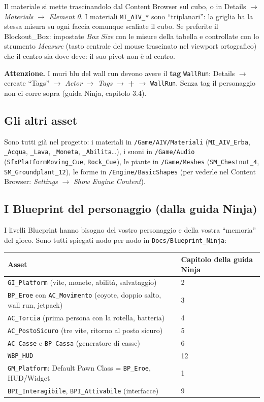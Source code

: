 \documentclass[a4paper,10pt]{article}
\newcommand{\nodo}[1]{\textsf{\textbf{#1}}}
\newcommand{\var}[1]{\texttt{#1}}
\newcommand{\attenzione}[1]{\par\smallskip\noindent\colorbox{orange!12}{\parbox{\dimexpr\linewidth-2\fboxsep}{\small\textbf{Attenzione.} #1}}\par\smallskip}
\begin{document}
Il materiale si mette trascinandolo dal Content Browser sul cubo, o in Details $\rightarrow$ \emph{Materials} $\rightarrow$ \emph{Element 0}. I materiali \var{MI\_AIV\_*} sono ``triplanari'': la griglia ha la stessa misura su ogni faccia comunque scaliate il cubo. Se preferite il Blockout\_Box: impostate \emph{Box Size} con le misure della tabella e controllate con lo strumento \emph{Measure} (tasto centrale del mouse trascinato nel viewport ortografico) che il centro sia dove deve: il suo pivot non è al centro.

\attenzione{I muri blu del wall run devono avere il \textbf{tag} \var{WallRun}: Details $\rightarrow$ cercate ``Tags'' $\rightarrow$ \emph{Actor} $\rightarrow$ \emph{Tags} $\rightarrow$ \nodo{+} $\rightarrow$ \var{WallRun}. Senza tag il personaggio non ci corre sopra (guida Ninja, capitolo 3.4).}

\subsection{Gli altri asset}

Sono tutti già nel progetto: i materiali in \texttt{/Game/AIV/Materiali} (\var{MI\_AIV\_Erba}, \var{\_Acqua}, \var{\_Lava}, \var{\_Moneta}, \var{\_Abilita}\dots), i suoni in \texttt{/Game/Audio} (\var{SfxPlatformMoving\_Cue}, \var{Rock\_Cue}), le piante in \texttt{/Game/Meshes} (\var{SM\_Chestnut\_4}, \var{SM\_Groundplant\_12}), le forme in \texttt{/Engine/BasicShapes} (per vederle nel Content Browser: \emph{Settings} $\rightarrow$ \emph{Show Engine Content}).

\subsection{I Blueprint del personaggio (dalla guida Ninja)}

I livelli Blueprint hanno bisogno del vostro personaggio e della vostra ``memoria'' del gioco. Sono tutti spiegati nodo per nodo in \texttt{Docs/Blueprint\_Ninja}:

\begin{center}
\begin{tabularx}{\linewidth}{lX}
\toprule
Asset & Capitolo della guida Ninja \\
\midrule
\var{GI\_Platform} (vite, monete, abilità, salvataggio) & 2 \\
\var{BP\_Eroe} con \var{AC\_Movimento} (coyote, doppio salto, wall run, jetpack) & 3 \\
\var{AC\_Torcia} (prima persona con la rotella, batteria) & 4 \\
\var{AC\_PostoSicuro} (tre vite, ritorno al posto sicuro) & 5 \\
\var{AC\_Casse} e \var{BP\_Cassa} (generatore di casse) & 6 \\
\var{WBP\_HUD} & 12 \\
\var{GM\_Platform}: Default Pawn Class = \var{BP\_Eroe}, HUD/Widget & 1 \\
\var{BPI\_Interagibile}, \var{BPI\_Attivabile} (interfacce) & 9 \\
\bottomrule
\end{tabularx}
\end{center}
\end{document}
